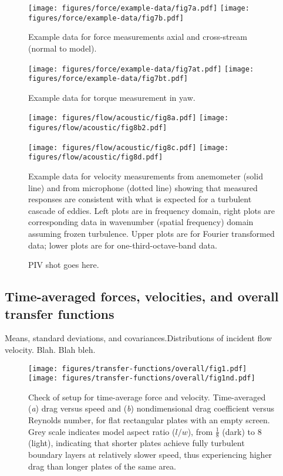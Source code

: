 \documentclass{jfm}
\begin{document}
\begin{figure} 
\centerline{\texttt{[image: figures/force/example-data/fig7a.pdf]}%
\texttt{[image: figures/force/example-data/fig7b.pdf]}}
\caption{Example data for force measurements axial and cross-stream (normal to model).}
\end{figure}

\begin{figure} 
\centerline{\texttt{[image: figures/force/example-data/fig7at.pdf]}%
\texttt{[image: figures/force/example-data/fig7bt.pdf]}}
\caption{Example data for torque measurement in yaw.}
\end{figure}

\begin{figure} 
\centerline{\texttt{[image: figures/flow/acoustic/fig8a.pdf]}%
\texttt{[image: figures/flow/acoustic/fig8b2.pdf]}}

\centerline{\texttt{[image: figures/flow/acoustic/fig8c.pdf]}%
\texttt{[image: figures/flow/acoustic/fig8d.pdf]}}

\caption{Example data for velocity measurements from anemometer (solid line) and from microphone (dotted line) showing that measured responses are consistent with what is expected for a turbulent cascade of eddies. Left plots are in frequency domain, right plots are corresponding data in wavenumber (spatial frequency) domain assuming frozen turbulence.  Upper plots are for Fourier transformed data; lower plots are for one-third-octave-band data.}
\end{figure}


\begin{figure} 
\centerline{}
\caption{PIV shot goes here.}
\end{figure}

\eject









\subsection{Time-averaged forces, velocities, and overall transfer functions}
Means, standard deviations, and covariances.Distributions of incident flow velocity. Blah. Blah bleh. 

\begin{figure} 
\centerline{\texttt{[image: figures/transfer-functions/overall/fig1.pdf]}%
\texttt{[image: figures/transfer-functions/overall/fig1nd.pdf]}}
\caption{Check of setup for time-average force and velocity.  Time-averaged (\textit{a}) drag versus speed and (\textit{b}) nondimensional drag coefficient versus Reynolds number, for flat rectangular plates with an empty screen.  Grey scale indicates model aspect ratio ($l/w$), from $\frac{1}{8}$ (dark) to \num{8} (light), indicating that shorter plates achieve fully turbulent boundary layers at relatively slower speed, thus experiencing higher drag than longer plates of the same area.}
\label{fig:overalldrag}
\end{figure}
\end{document}
